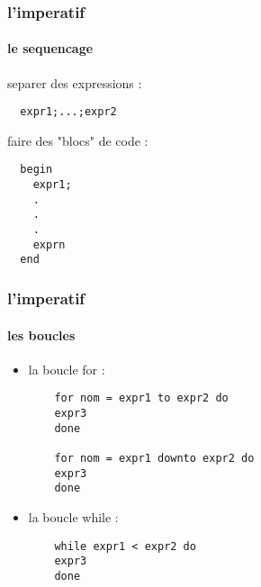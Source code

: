 

\begin{frame}[fragile]
  \frametitle{l'imperatif}
  \framesubtitle{le sequencage}
  separer des expressions :
  \begin{lstlisting}
  expr1;...;expr2
  \end{lstlisting}
  faire des "blocs" de code :
  \begin{lstlisting}
  begin
    expr1; 
    .
    .
    .
    exprn
  end
  \end{lstlisting}
\end{frame}

\begin{frame}[fragile]
    \frametitle{l'imperatif}
    \framesubtitle{les boucles}
    \begin{itemize}
      \item
	la boucle for :
	\begin{lstlisting}
	for nom = expr1 to expr2 do 
	expr3
	done

	for nom = expr1 downto expr2 do
	expr3
	done
	\end{lstlisting}
      \item
	la boucle while :
	\begin{lstlisting}
	while expr1 < expr2 do
	expr3
	done
      \end{lstlisting}
  \end{itemize}
\end{frame}
